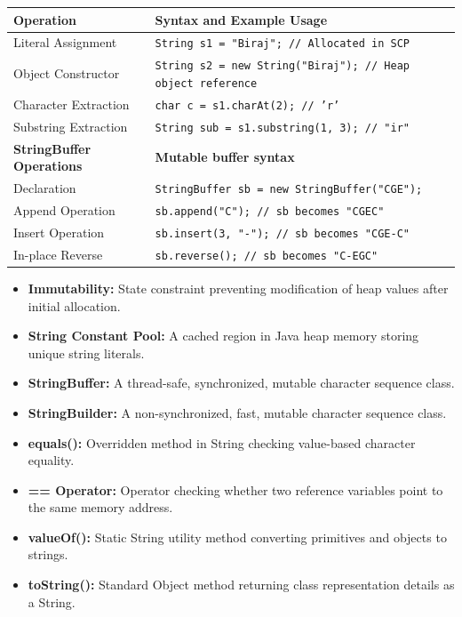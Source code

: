 \documentclass[12pt,a4paper]{article}
\renewcommand{\arraystretch}{1.45}
\begin{document}
\begin{tcolorbox}[formulabox, title={\textbf{String \& StringBuffer Syntax}}]
{\renewcommand{\arraystretch}{1.3}%
\begin{tabularx}{\linewidth}{l Y}
\textbf{Operation} & \textbf{Syntax and Example Usage} \\
\hline
Literal Assignment & \texttt{String s1 = "Biraj"; // Allocated in SCP} \\
Object Constructor & \texttt{String s2 = new String("Biraj"); // Heap object reference} \\
Character Extraction & \texttt{char c = s1.charAt(2); // 'r'} \\
Substring Extraction & \texttt{String sub = s1.substring(1, 3); // "ir"} \\
\hline
\textbf{StringBuffer Operations} & \textbf{Mutable buffer syntax} \\
\hline
Declaration & \texttt{StringBuffer sb = new StringBuffer("CGE");} \\
Append Operation & \texttt{sb.append("C"); // sb becomes "CGEC"} \\
Insert Operation & \texttt{sb.insert(3, "-"); // sb becomes "CGE-C"} \\
In-place Reverse & \texttt{sb.reverse(); // sb becomes "C-EGC"} \\
\end{tabularx}}
\end{tcolorbox}

\begin{tcolorbox}[defbox, title={\textbf{One-Line Definitions}}]
\begin{itemize}[leftmargin=*, itemsep=2pt]
  \item \textbf{Immutability:} State constraint preventing modification of heap values after initial allocation.
  \item \textbf{String Constant Pool:} A cached region in Java heap memory storing unique string literals.
  \item \textbf{StringBuffer:} A thread-safe, synchronized, mutable character sequence class.
  \item \textbf{StringBuilder:} A non-synchronized, fast, mutable character sequence class.
  \item \textbf{equals():} Overridden method in String checking value-based character equality.
  \item \textbf{== Operator:} Operator checking whether two reference variables point to the same memory address.
  \item \textbf{valueOf():} Static String utility method converting primitives and objects to strings.
  \item \textbf{toString():} Standard Object method returning class representation details as a String.
\end{itemize}
\end{tcolorbox}
\end{document}
